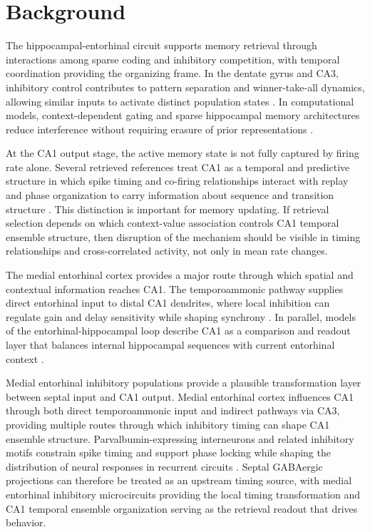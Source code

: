 \section{Background}

The hippocampal-entorhinal circuit supports memory retrieval through interactions among sparse coding and inhibitory competition, with temporal coordination providing the organizing frame. In the dentate gyrus and CA3, inhibitory control contributes to pattern separation and winner-take-all dynamics, allowing similar inputs to activate distinct population states \cite{arxiv210506057,arxiv170507614}. In computational models, context-dependent gating and sparse hippocampal memory architectures reduce interference without requiring erasure of prior representations \cite{arxiv171109876,arxiv220200159}.

At the CA1 output stage, the active memory state is not fully captured by firing rate alone. Several retrieved references treat CA1 as a temporal and predictive structure in which spike timing and co-firing relationships interact with replay and phase organization to carry information about sequence and transition structure \cite{arxiv191211126,arxiv200611975,arxiv230511982}. This distinction is important for memory updating. If retrieval selection depends on which context-value association controls CA1 temporal ensemble structure, then disruption of the mechanism should be visible in timing relationships and cross-correlated activity, not only in mean rate changes.

The medial entorhinal cortex provides a major route through which spatial and contextual information reaches CA1. The temporoammonic pathway supplies direct entorhinal input to distal CA1 dendrites, where local inhibition can regulate gain and delay sensitivity while shaping synchrony \cite{arxiv240910460,arxiv240910431}. In parallel, models of the entorhinal-hippocampal loop describe CA1 as a comparison and readout layer that balances internal hippocampal sequences with current entorhinal context \cite{arxiv250112615,arxiv200611975}.

Medial entorhinal inhibitory populations provide a plausible transformation layer between septal input and CA1 output. Medial entorhinal cortex influences CA1 through both direct temporoammonic input and indirect pathways via CA3, providing multiple routes through which inhibitory timing can shape CA1 ensemble structure. Parvalbumin-expressing interneurons and related inhibitory motifs constrain spike timing and support phase locking while shaping the distribution of neural responses in recurrent circuits \cite{arxiv160903622,arxiv220910634,arxiv240517745}. Septal GABAergic projections can therefore be treated as an upstream timing source, with medial entorhinal inhibitory microcircuits providing the local timing transformation and CA1 temporal ensemble organization serving as the retrieval readout that drives behavior.
